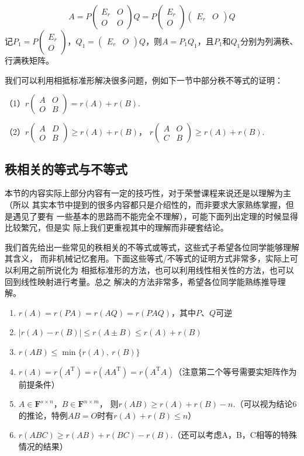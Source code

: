 $$A=P\begin{pmatrix}
	E_r & O \\ O & O
\end{pmatrix}Q=P\begin{pmatrix}
	E_r \\ O
\end{pmatrix}\begin{pmatrix}
	E_r & O
\end{pmatrix}Q$$
记$P_1=P\begin{pmatrix}
	E_r \\ O
\end{pmatrix}$，$Q_1=\begin{pmatrix}
	E_r & O
\end{pmatrix}Q$，则$A=P_1Q_1$，且$P_1$和$Q_1$分别为列满秩、行满秩矩阵。

我们可以利用相抵标准形解决很多问题，例如下一节中部分秩不等式的证明：
\begin{example}
	\textup{（1）}$r\begin{pmatrix}
		A & O \\ O & B
	\end{pmatrix}=r(A)+r(B)$.

	\textup{（2）}$r\begin{pmatrix}
		A & D \\ O & B
	\end{pmatrix}\ge r(A)+r(B)$，
	$r\begin{pmatrix}
		A & O \\ C & B
	\end{pmatrix}\ge r(A)+r(B)$.
\end{example}

\subsection{秩相关的等式与不等式}
本节的内容实际上部分内容有一定的技巧性，对于荣誉课程来说还是以理解为主（所以
其实本节中提到的很多内容都只是介绍性的，而非要求大家熟练掌握，但是遇见了要有
一些基本的思路而不能完全不理解），可能下面列出定理的时候显得比较繁冗，但是实
际上我们更重视其中的理解而非硬套结论。

我们首先给出一些常见的秩相关的不等式或等式，这些式子希望各位同学能够理解其含义，
而非机械记忆套用。下面这些等式/不等式的证明方式非常多，实际上可以利用之前所说化为
相抵标准形的方法，也可以利用线性相关性的方法，也可以回到线性映射进行考量。总之
解决的方法非常多，希望各位同学能熟练推导理解。
\begin{enumerate}
	\item $r(A)=r(PA)=r(AQ)=r(PAQ)$，其中$P$、$Q$可逆
	\item $|r(A)-r(B)|\le r(A\pm B) \le r(A)+r(B)$
	\item $r(AB) \le \min\{r(A),\ r(B)\}$
	\item $r(A)=r(A^\mathrm{T})=r(AA^\mathrm{T})=r(A^\mathrm{T}A)$（注意第二个等号需要实矩阵作为前提条件）
	\item $A \in \mathbf{F}^{s \times n}$，$B \in \mathbf{F}^{n \times m}$，
	则$r(AB) \ge r(A)+r(B)-n$.（可以视为结论6的推论，特例$AB=O$时有$r(A)+r(B)\le n$）
	\item $r(ABC) \ge r(AB)+r(BC)-r(B)$.（还可以考虑A，B，C相等的特殊情况的结果）
\end{enumerate}

